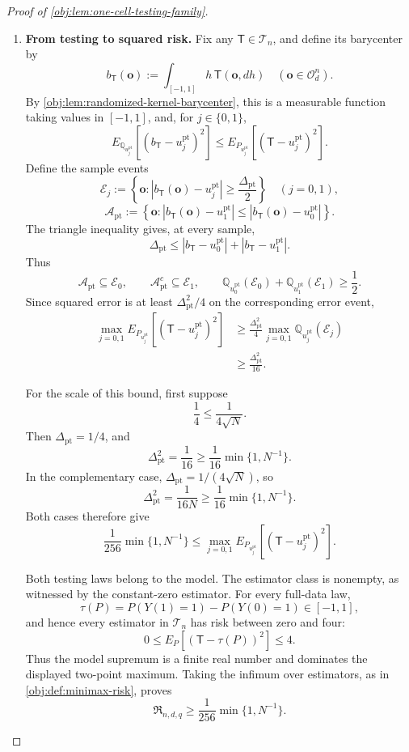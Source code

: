 \documentclass[11pt]{article}
\begin{document}
\begin{proof}[Proof of \cref{obj:lem:one-cell-testing-family}]
\begin{enumerate}
\item \textbf{From testing to squared risk.}
Fix any \(\mathsf T\in\mathcal T_n\), and define its barycenter by
\[
b_{\mathsf T}(\boldsymbol o)
:=
\int_{[-1,1]}h\,\mathsf T(\boldsymbol o,dh)
\quad(\boldsymbol o\in\mathcal O_d^n).
\]
By \cref{obj:lem:randomized-kernel-barycenter}, this is a measurable function taking values in \([-1,1]\), and, for \(j\in\{0,1\}\),
\[
E_{\mathbb Q_{u_j^{\mathrm{pt}}}}
 \left[(b_{\mathsf T}-u_j^{\mathrm{pt}})^2\right]
\le
E_{P_{u_j^{\mathrm{pt}}}}
 \left[(\mathsf T-u_j^{\mathrm{pt}})^2\right].
\]
Define the sample events
\[
\mathscr E_j:=
\left\{\boldsymbol o:
 |b_{\mathsf T}(\boldsymbol o)-u_j^{\mathrm{pt}}|
 \ge\frac{\Delta_{\mathrm{pt}}}{2}\right\}
\quad(j=0,1),
\]
\[
\mathscr A_{\mathrm{pt}}:=
\left\{\boldsymbol o:
 |b_{\mathsf T}(\boldsymbol o)-u_1^{\mathrm{pt}}|
 \le
 |b_{\mathsf T}(\boldsymbol o)-u_0^{\mathrm{pt}}|\right\}.
\]
The triangle inequality gives, at every sample,
\[
\Delta_{\mathrm{pt}}
\le
|b_{\mathsf T}-u_0^{\mathrm{pt}}|
+
|b_{\mathsf T}-u_1^{\mathrm{pt}}|.
\]
Thus
\[
\mathscr A_{\mathrm{pt}}\subseteq\mathscr E_0,
\qquad
\mathscr A_{\mathrm{pt}}^c\subseteq\mathscr E_1,
\qquad
\mathbb Q_{u_0^{\mathrm{pt}}}(\mathscr E_0)
+\mathbb Q_{u_1^{\mathrm{pt}}}(\mathscr E_1)
\ge\frac12.
\]
Since squared error is at least \(\Delta_{\mathrm{pt}}^2/4\) on the corresponding error event,
\[
\begin{aligned}
\max_{j=0,1}
E_{P_{u_j^{\mathrm{pt}}}}
 \left[(\mathsf T-u_j^{\mathrm{pt}})^2\right]
&\ge
\frac{\Delta_{\mathrm{pt}}^2}{4}
\max_{j=0,1}
\mathbb Q_{u_j^{\mathrm{pt}}}(\mathscr E_j)\\
&\ge\frac{\Delta_{\mathrm{pt}}^2}{16}.
\end{aligned}
\]

For the scale of this bound, first suppose
\[
\frac14\le\frac1{4\sqrt N}.
\]
Then \(\Delta_{\mathrm{pt}}=1/4\), and
\[
\Delta_{\mathrm{pt}}^2=\frac1{16}
\ge\frac1{16}\min\{1,N^{-1}\}.
\]
In the complementary case,
\(\Delta_{\mathrm{pt}}=1/(4\sqrt N)\), so
\[
\Delta_{\mathrm{pt}}^2=\frac1{16N}
\ge\frac1{16}\min\{1,N^{-1}\}.
\]
Both cases therefore give
\[
\frac1{256}\min\{1,N^{-1}\}
\le
\max_{j=0,1}
E_{P_{u_j^{\mathrm{pt}}}}
 \left[(\mathsf T-u_j^{\mathrm{pt}})^2\right].
\]

Both testing laws belong to the model. The estimator class is nonempty, as witnessed by the constant-zero estimator. For every full-data law,
\[
\tau(P)=P(Y(1)=1)-P(Y(0)=1)\in[-1,1],
\]
and hence every estimator in \(\mathcal T_n\) has risk between zero and four:
\[
0\le E_P[(\mathsf T-\tau(P))^2]\le4.
\]
Thus the model supremum is a finite real number and dominates the displayed two-point maximum. Taking the infimum over estimators, as in
\cref{obj:def:minimax-risk}, proves
\[
\mathfrak R_{n,d,q}
\ge\frac1{256}\min\{1,N^{-1}\}.
\]


\end{enumerate}
\end{proof}
\end{document}

